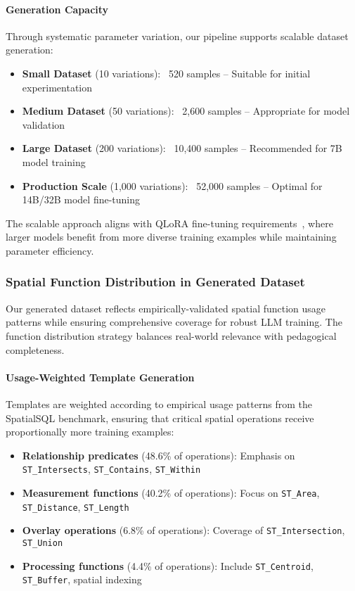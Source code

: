 \paragraph{Generation Capacity}
Through systematic parameter variation, our pipeline supports scalable dataset generation:
\begin{itemize}
    \item \textbf{Small Dataset} (10 variations): ~520 samples -- Suitable for initial experimentation
    \item \textbf{Medium Dataset} (50 variations): ~2,600 samples -- Appropriate for model validation
    \item \textbf{Large Dataset} (200 variations): ~10,400 samples -- Recommended for 7B model training
    \item \textbf{Production Scale} (1,000 variations): ~52,000 samples -- Optimal for 14B/32B model fine-tuning
\end{itemize}

The scalable approach aligns with QLoRA fine-tuning requirements~\cite{dettmers2023qlora}, where larger models benefit from more diverse training examples while maintaining parameter efficiency.

\subsubsection{Spatial Function Distribution in Generated Dataset}
\label{subsubsec:function-distribution}

Our generated dataset reflects empirically-validated spatial function usage patterns while ensuring comprehensive coverage for robust LLM training. The function distribution strategy balances real-world relevance with pedagogical completeness.

\paragraph{Usage-Weighted Template Generation}
Templates are weighted according to empirical usage patterns from the SpatialSQL benchmark, ensuring that critical spatial operations receive proportionally more training examples:
\begin{itemize}
    \item \textbf{Relationship predicates} (48.6\% of operations): Emphasis on \texttt{ST\_Intersects}, \texttt{ST\_Contains}, \texttt{ST\_Within}
    \item \textbf{Measurement functions} (40.2\% of operations): Focus on \texttt{ST\_Area}, \texttt{ST\_Distance}, \texttt{ST\_Length}
    \item \textbf{Overlay operations} (6.8\% of operations): Coverage of \texttt{ST\_Intersection}, \texttt{ST\_Union}
    \item \textbf{Processing functions} (4.4\% of operations): Include \texttt{ST\_Centroid}, \texttt{ST\_Buffer}, spatial indexing
\end{itemize}

